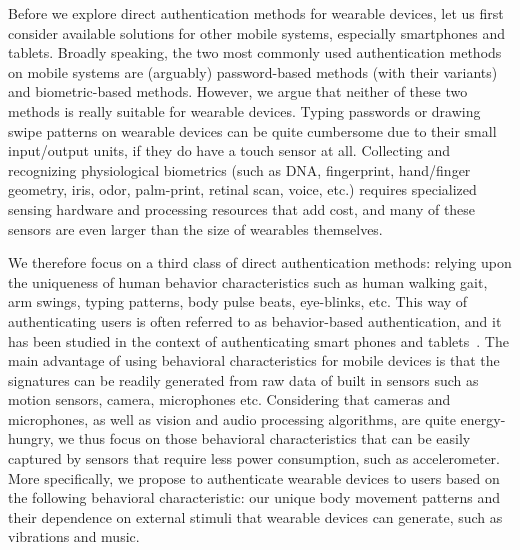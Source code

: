 Before we explore direct authentication methods for wearable devices, let us
first consider available solutions for other mobile systems, especially
smartphones and tablets. Broadly speaking, the two most commonly used
authentication methods on mobile systems are (arguably) password-based methods
(with their variants) and biometric-based methods. However, we argue that
neither of these two methods is really suitable for wearable devices. Typing
passwords or drawing swipe patterns on wearable devices can be quite
cumbersome due to their small input/output units, if they do have a touch
sensor at all. Collecting and recognizing physiological biometrics (such as
DNA, fingerprint, hand/finger geometry, iris, odor, palm-print, retinal scan,
voice, etc.) requires specialized sensing hardware and processing resources
that add cost, and many of these sensors are even larger than the size of wearables
themselves.

We therefore focus on a third class of direct authentication methods: relying upon the uniqueness of human behavior characteristics such as human walking gait, arm swings, typing patterns, body pulse beats, eye-blinks, etc. This way of authenticating users is often referred to as behavior-based authentication, and it has been studied in the context of authenticating smart phones and tablets~\cite{rahman2014bodybeat,cornelius2014wearable,stevenage1999visual,okumura2006study,monrose2000keystroke,jorgensen2011mouse,bo2013silentsense,de2012touch}. The main advantage of using behavioral characteristics for mobile devices is that the signatures can be readily generated from raw data of built in sensors such as motion sensors, camera, microphones etc. Considering that cameras and microphones, as well as vision and audio processing algorithms, are quite energy-hungry, we thus focus on those behavioral characteristics that can be easily captured by sensors that require less power consumption, such as accelerometer. More specifically, we propose to authenticate wearable devices to users based on the following behavioral characteristic: our unique body movement patterns and their dependence on external stimuli that wearable devices can generate, such as vibrations and music.

